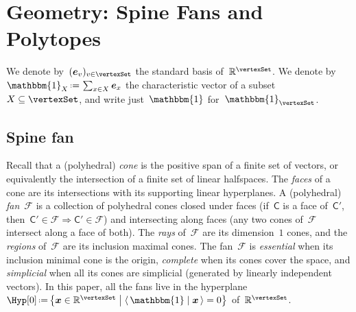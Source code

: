 \documentclass{amsart}
\theoremstyle{definition}
\newcommand{\R}{\mathbb{R}} %
\renewcommand{\c}[1]{{\mathcal{#1}}} %
\renewcommand{\b}[1]{{\boldsymbol{#1}}} %
\newcommand{\bigset}[2]{\big\{ #1 \;\big|\; #2 \big\}} %
\newcommand{\dotprod}[2]{\langle \, #1 \; | \; #2 \, \rangle} %
\newcommand{\one}{\mathbbm{1}} %
\newcommand{\eqdef}{\mbox{\,\raisebox{0.2ex}{\scriptsize\ensuremath{\mathrm:}}\ensuremath{=}\,}} %
\newcommand{\eg}{\textit{e.g.}~} %
\newcommand{\darkblue}{\color{darkblue}} %
\newcommand{\defn}[1]{\textsl{\darkblue #1}} %
\newcommand{\polytope}[1]{\mathsf{#1}} %
\newcommand{\weight}{\omega} %
\begin{document}

\section{Geometry: Spine Fans and Polytopes}
\label{sec:geometry}

We denote by~$(\b{e}_v)_{v \in \vertexSet}$ the standard basis of~$\R^{\vertexSet}$.
We denote by~$\one_X \eqdef \sum_{x \in X} \b{e}_x$ the characteristic vector of a subset~$X \subseteq \vertexSet$, and write just~$\one$ for~$\one_{\vertexSet}$.


\subsection{Spine fan}
\label{subsec:spineFan}

%
Recall that a (polyhedral) \defn{cone} is the positive span of a finite set of vectors, or equivalently the intersection of a finite set of linear halfspaces.
The \defn{faces} of a cone are its intersections with its supporting linear hyperplanes.
A (polyhedral) \defn{fan}~$\c{F}$ is a collection of polyhedral cones closed under faces (if~$\polytope{C}$ is a face of~$\polytope{C'}$, then~$\polytope{C'} \in \c{F} \Rightarrow \polytope{C'} \in \c{F}$) and intersecting along faces (any two cones of~$\c{F}$ intersect along a face of both).
The \defn{rays} of~$\c{F}$ are its dimension~$1$ cones, and the \defn{regions} of~$\c{F}$ are its inclusion maximal cones.
The fan~$\c{F}$ is \defn{essential} when its inclusion minimal cone is the origin, \defn{complete} when its cones cover the space, and \defn{simplicial} when all its cones are simplicial (generated by linearly independent vectors).
In this paper, all the fans live in the hyperplane~${\Hyp[0] \eqdef \bigset{\b{x} \in \R^{\vertexSet}}{\dotprod{\one}{\b{x}} = 0}}$ of~$\R^{\vertexSet}$.
\end{document}
